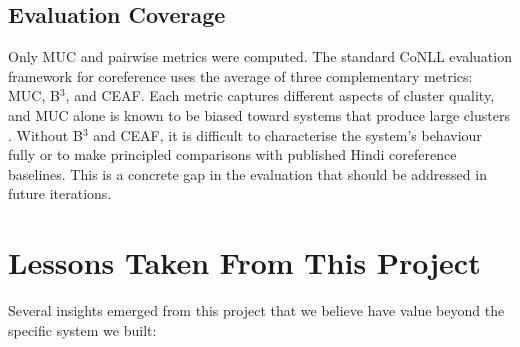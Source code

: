 \documentclass[12pt,a4paper]{report}
\begin{document}
\subsection{Evaluation Coverage}

Only MUC and pairwise metrics were computed. The standard CoNLL evaluation framework for coreference uses the average of three complementary metrics: MUC, B$^3$, and CEAF. Each metric captures different aspects of cluster quality, and MUC alone is known to be biased toward systems that produce large clusters \cite{moosavi2016coreference}. Without B$^3$ and CEAF, it is difficult to characterise the system's behaviour fully or to make principled comparisons with published Hindi coreference baselines. This is a concrete gap in the evaluation that should be addressed in future iterations.

\section{Lessons Taken From This Project}

Several insights emerged from this project that we believe have value beyond the specific system we built:
\end{document}
